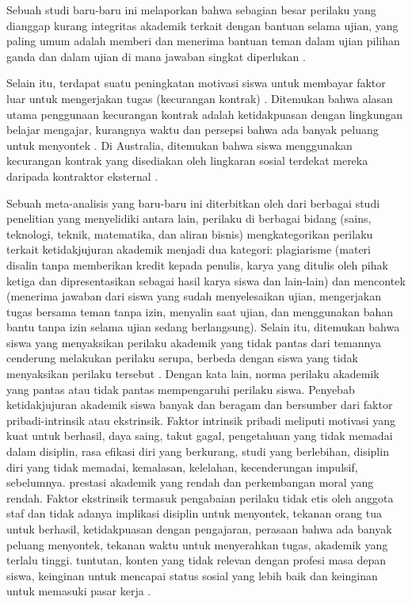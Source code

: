 Sebuah studi baru-baru ini melaporkan bahwa sebagian besar perilaku yang dianggap kurang integritas akademik terkait dengan bantuan selama ujian, yang paling umum adalah memberi dan menerima bantuan teman dalam ujian pilihan ganda dan dalam ujian di mana jawaban singkat diperlukan \citep{harper2021detecting}.

Selain itu, terdapat suatu peningkatan motivasi siswa untuk membayar faktor luar untuk mengerjakan tugas (kecurangan kontrak) \citep{birks2020managing}. Ditemukan bahwa alasan utama penggunaan kecurangan kontrak adalah ketidakpuasan dengan lingkungan belajar mengajar, kurangnya waktu dan persepsi bahwa ada banyak peluang untuk menyontek \citep{bretag2019contract} \citep{foltynek2018analysis}. Di Australia, ditemukan bahwa siswa menggunakan kecurangan kontrak yang disediakan oleh lingkaran sosial terdekat mereka daripada kontraktor eksternal \citep{harper2021detecting}.

Sebuah meta-analisis yang baru-baru ini diterbitkan oleh \citet{krou2020achievement} dari berbagai studi penelitian yang menyelidiki antara lain, perilaku di berbagai bidang (sains, teknologi, teknik, matematika, dan aliran bisnis) mengkategorikan perilaku terkait ketidakjujuran akademik menjadi dua kategori: plagiarisme (materi disalin tanpa memberikan kredit kepada penulis, karya yang ditulis oleh pihak ketiga dan dipresentasikan sebagai hasil karya siswa dan lain-lain) dan mencontek (menerima jawaban dari siswa yang sudah menyelesaikan ujian, mengerjakan tugas bersama teman tanpa izin, menyalin saat ujian, dan menggunakan bahan bantu tanpa izin selama ujian sedang berlangsung). Selain itu, ditemukan bahwa siswa yang menyaksikan perilaku akademik yang tidak pantas dari temannya cenderung melakukan perilaku serupa, berbeda dengan siswa yang tidak menyaksikan perilaku tersebut \citep{ahmed2018student} \citep{barbaranelli2018machiavellian} \citep{kiekkas2020reasons}. Dengan kata lain, norma perilaku akademik yang pantas atau tidak pantas mempengaruhi perilaku siswa. Penyebab ketidakjujuran akademik siswa banyak dan beragam dan bersumber dari faktor pribadi-intrinsik atau ekstrinsik. Faktor intrinsik pribadi meliputi motivasi yang kuat untuk berhasil, daya saing, takut gagal, pengetahuan yang tidak memadai dalam disiplin, rasa efikasi diri yang berkurang, studi yang berlebihan, disiplin diri yang tidak memadai, kemalasan, kelelahan, kecenderungan impulsif, sebelumnya. prestasi akademik yang rendah dan perkembangan moral yang rendah. Faktor ekstrinsik termasuk pengabaian perilaku tidak etis oleh anggota staf dan tidak adanya implikasi disiplin untuk menyontek, tekanan orang tua untuk berhasil, ketidakpuasan dengan pengajaran, perasaan bahwa ada banyak peluang menyontek, tekanan waktu untuk menyerahkan tugas, akademik yang terlalu tinggi. tuntutan, konten yang tidak relevan dengan profesi masa depan siswa, keinginan untuk mencapai status sosial yang lebih baik dan keinginan untuk memasuki pasar kerja \citep{amigud2019246} \citep{birks2020managing} \citep{bretag2019contract} \citep{kiekkas2020reasons} \citep{krou2020achievement} \citep{murdock2006motivational}.

